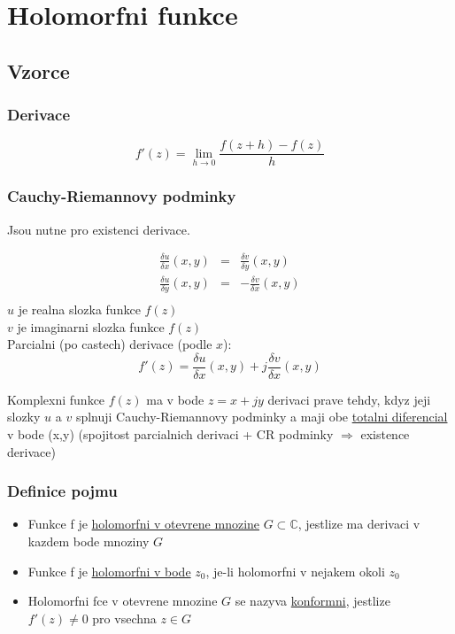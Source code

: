 \chapter{Holomorfni funkce}

\section*{Vzorce}
\subsection*{Derivace}
\begin{equation}
\label{eq:derivace}
f'(z) = \lim_{h \to 0} \frac{f(z+h)-f(z)}{h}
\end{equation}

\subsection*{Cauchy-Riemannovy podminky}
Jsou nutne pro existenci derivace.

\begin{equation}
\label{eq:cauchy}
\begin{array}{ccc}
\frac{\delta u}{\delta x} (x,y) & = & \frac{\delta v}{\delta y} (x,y)\\
\frac{\delta u}{\delta y} (x,y) & = & -\frac{\delta v}{\delta x} (x,y)\\
\end{array}
\end{equation}
$u$ je realna slozka funkce $f(z)$\\
$v$ je imaginarni slozka funkce $f(z)$\\

Parcialni (po castech) derivace (podle $x$):
$$f'(z) = \frac{\delta u}{\delta x} (x,y) + j\frac{\delta v}{\delta x} (x,y)$$

Komplexni funkce $f(z)$ ma v bode $z = x+jy$ derivaci prave tehdy, kdyz jeji slozky $u$ a $v$ splnuji Cauchy-Riemannovy podminky a maji obe \underline{totalni diferencial} v bode (x,y) (spojitost parcialnich derivaci + CR podminky $\Rightarrow$ existence derivace)

\subsection*{Definice pojmu}
\begin{itemize}
\item Funkce f je \underline{holomorfni v otevrene mnozine} $G \subset \mathbb{C}$, jestlize ma derivaci v kazdem bode mnoziny $G$
\item Funkce f je \underline{holomorfni v bode} $z_0$, je-li holomorfni v nejakem okoli $z_0$
\item Holomorfni fce v otevrene mnozine $G$ se nazyva \underline{konformni}, jestlize $f'(z) \neq 0$ pro vsechna $z \in G$
\end{itemize}

